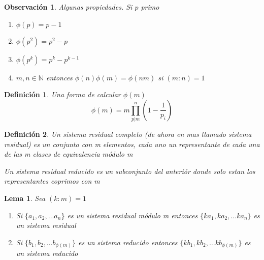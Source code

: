 \documentclass{article}
\theoremstyle{break}
\newtheorem{lemma}[theorem]{Lema}
\newtheorem*{remark}{Observación}
\newtheorem{definition}{Definición}[section]
\def \N{\mathbb{N}}
\begin{document}
        \begin{remark}
            Algunas propiedades. Si $p$ primo
            \begin{enumerate}
                \item $\phi(p) = p-1$
                \item $\phi(p^2) = p^2-p$
                \item $\phi(p^k) = p^k - p^{k-1}$
                \item $m,n \in \N$ entonces $\phi(n)\phi(m) = \phi(nm)$ si $(m:n)=1$
            \end{enumerate}
        \end{remark}
        \begin{definition}
            Una forma de calcular $\phi(m)$
            $$\phi(m)=m\prod_{p|m}^n (1-\frac{1}{p_i})$$
        \end{definition}
        \begin{definition}
            Un sistema residual completo (de ahora en mas llamado sistema residual) es un conjunto 
            con m elementos, cada uno un representante de cada una de las m clases de equivalencia módulo m

            Un sistema residual reducido es un subconjunto del anteriór donde solo estan los representantes
            coprimos con m
        \end{definition}

        \begin{lemma}
            Sea $(k:m)=1$
            \begin{enumerate}
                \item Si $\{a_1,a_2,\ldots a_n\}$ es un sistema residual 
                módulo m entonces $\{ka_1,ka_2,\ldots ka_n\}$ es un sistema residual
                \item Si $\{b_1,b_2,\ldots b_{\phi(m)}\}$ es un sistema reducido entonces 
                $\{kb_1,kb_2,\ldots kb_{\phi(m)}\}$ es un sistema reducido
            \end{enumerate}
        \end{lemma}
\end{document}
